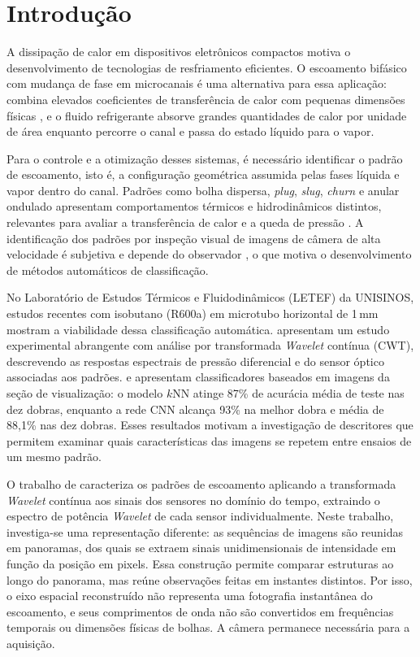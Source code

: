 \chapter{Introdução}\label{cap:introducao}

A dissipação de calor em dispositivos eletrônicos compactos motiva o
desenvolvimento de tecnologias de resfriamento eficientes. O escoamento
bifásico com mudança de fase em microcanais é uma alternativa para essa
aplicação: combina elevados coeficientes de transferência de calor com pequenas
dimensões físicas \cite{cheng2023}, e o fluido refrigerante absorve grandes quantidades de
calor por unidade de área enquanto percorre o canal e passa do estado líquido para o vapor.

Para o controle e a otimização desses sistemas, é necessário identificar o padrão de
escoamento, isto é, a configuração geométrica assumida pelas fases líquida e vapor dentro
do canal. Padrões como bolha dispersa, \textit{plug}, \textit{slug}, \textit{churn} e
anular ondulado apresentam comportamentos térmicos e hidrodinâmicos distintos, relevantes
para avaliar a transferência de calor e a queda de pressão \cite{cheng2023,deoliveira2021}. A identificação dos padrões por
inspeção visual de imagens de câmera de alta velocidade é subjetiva e depende
do observador \cite{dias2025knn}, o que motiva o desenvolvimento de métodos
automáticos de classificação.

No Laboratório de Estudos Térmicos e Fluidodinâmicos (LETEF) da UNISINOS, estudos
recentes com isobutano (R600a) em microtubo horizontal de 1\,mm mostram a viabilidade
dessa classificação automática.  apresentam um estudo
experimental abrangente com análise por transformada \textit{Wavelet} contínua (CWT),
descrevendo as respostas espectrais de pressão diferencial e do sensor óptico
associadas aos padrões.
 e  apresentam classificadores baseados
em imagens da seção de visualização: o modelo $k$NN atinge 87\% de acurácia média de teste
nas dez dobras, enquanto a rede CNN alcança 93\% na melhor dobra e média de
88{,}1\% nas dez dobras.
Esses resultados motivam a investigação de descritores que permitem examinar quais
características das imagens se repetem entre ensaios de um mesmo padrão.

O trabalho de  caracteriza os padrões de escoamento
aplicando a transformada \textit{Wavelet} contínua aos sinais dos sensores no domínio do
tempo, extraindo o espectro de potência \textit{Wavelet} de cada sensor individualmente.
Neste trabalho, investiga-se uma representação diferente: as sequências de imagens são
reunidas em panoramas, dos quais se extraem sinais unidimensionais de intensidade em
função da posição em pixels. Essa construção permite comparar estruturas ao longo do
panorama, mas reúne observações feitas em instantes distintos. Por isso, o eixo espacial
reconstruído não representa uma fotografia instantânea do escoamento, e seus
comprimentos de onda não são convertidos em frequências temporais ou dimensões físicas
de bolhas. A câmera permanece necessária para a aquisição.

